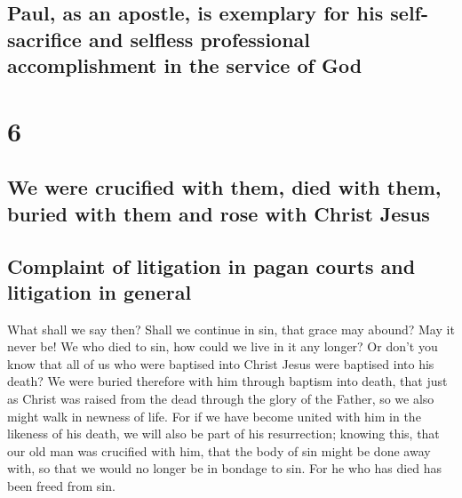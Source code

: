 \hypertarget{paul-as-an-apostle-is-exemplary-for-his-self-sacrifice-and-selfless-professional-accomplishment-in-the-service-of-god}{%
\subsection{Paul, as an apostle, is exemplary for his self-sacrifice and
selfless professional accomplishment in the service of
God}\label{paul-as-an-apostle-is-exemplary-for-his-self-sacrifice-and-selfless-professional-accomplishment-in-the-service-of-god}}

\hypertarget{section-5}{%
\section{6}\label{section-5}}

\hypertarget{we-were-crucified-with-them-died-with-them-buried-with-them-and-rose-with-christ-jesus}{%
\subsection{We were crucified with them, died with them, buried with
them and rose with Christ
Jesus}\label{we-were-crucified-with-them-died-with-them-buried-with-them-and-rose-with-christ-jesus}}

\hypertarget{complaint-of-litigation-in-pagan-courts-and-litigation-in-general}{%
\subsection{Complaint of litigation in pagan courts and litigation in
general}\label{complaint-of-litigation-in-pagan-courts-and-litigation-in-general}}

 What shall we say then? Shall we continue in sin, that
grace may abound?  May it never be! We who died to sin,
how could we live in it any longer?  Or don't you know
that all of us who were baptised into Christ Jesus were baptised into
his death?  We were buried therefore with him through
baptism into death, that just as Christ was raised from the dead through
the glory of the Father, so we also might walk in newness of life.
 For if we have become united with him in the likeness of
his death, we will also be part of his resurrection; 
knowing this, that our old man was crucified with him, that the body of
sin might be done away with, so that we would no longer be in bondage to
sin.  For he who has died has been freed from sin.

